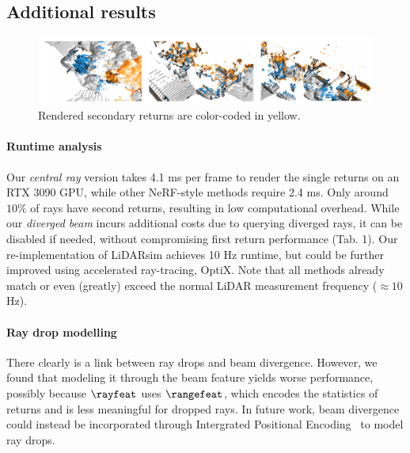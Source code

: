 \subsection{Additional results}
\label{sec:supp_results}
\begin{figure}[!t]
    \centering
        \includegraphics[width=1.0\textwidth]{content/main/images/rebuttal_secondary_return.pdf}
        \caption{Rendered secondary returns are color-coded in {\setlength{\fboxsep}{0pt}\colorbox{sdpoints}{yellow}}.}
    \label{fig:rebuttal_second_return}
\end{figure}
\paragraph{Runtime analysis}
Our \textit{central ray} version takes 4.1 ms per frame to render the single returns on an RTX 3090 GPU, while other NeRF-style methods require 2.4 ms. Only around $10\%$ of rays have second returns, resulting in low computational overhead. While our \textit{diverged beam} incurs additional costs due to querying diverged rays, it can be disabled if needed, without compromising first return performance (\cf Tab. 1). Our re-implementation of LiDARsim achieves 10 Hz runtime, but could be further improved using accelerated ray-tracing, \eg OptiX. Note that all methods already match or even (greatly) exceed the normal LiDAR measurement frequency (${\approx}10$ Hz). 

\paragraph{Ray drop modelling}
There clearly is a link between ray drops and beam divergence. However, we found that modeling it through the beam feature yields worse performance, possibly because $\rayfeat$ uses $\rangefeat$, which encodes the statistics of returns and is less meaningful for dropped rays. In future work, beam divergence could instead be incorporated through Intergrated Positional Encoding~\cite{barron2023zipnerf} to model ray drops.

